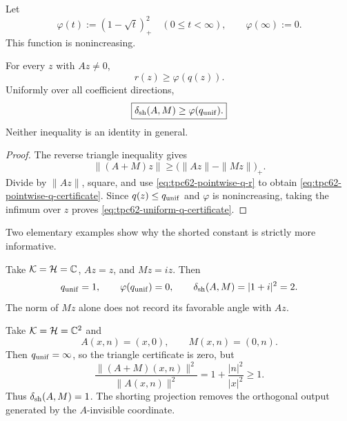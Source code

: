 Let
\begin{equation}
 \varphi(t):=(1-\sqrt t)_+^2
 \quad(0\le t<\infty),
 \qquad
 \varphi(\infty):=0.
 \label{eq:tpc62-triangle-profile}
\end{equation}
This function is nonincreasing.

\begin{proposition}
\label{prop:tpc62-q-certificates}
For every \(z\) with \(Az\ne0\),
\begin{equation}
 \boxed{r(z)\ge\varphi(q(z)).}
 \label{eq:tpc62-pointwise-q-certificate}
\end{equation}
Uniformly over all coefficient directions,
\begin{equation}
 \boxed{
 \delta_{\rm sh}(A,M)\ge\varphi(q_{\rm unif}).}
 \label{eq:tpc62-uniform-q-certificate}
\end{equation}
Neither inequality is an identity in general.
\end{proposition}

\begin{proof}
The reverse triangle inequality gives
\[
 \|(A+M)z\|
 \ge\bigl(\|Az\|-\|Mz\|\bigr)_+.
\]
Divide by \(\|Az\|\), square, and use
\eqref{eq:tpc62-pointwise-q-r} to obtain
\eqref{eq:tpc62-pointwise-q-certificate}.  Since
\(q(z)\le q_{\rm unif}\) and \(\varphi\) is nonincreasing, taking the
infimum over \(z\) proves
\eqref{eq:tpc62-uniform-q-certificate}.
\end{proof}

Two elementary examples show why the shorted constant is strictly more
informative.

\begin{example}
\label{ex:tpc62-q-angle-loss}
Take \(\mathcal K=\mathcal H=\mathbb C\), \(Az=z\), and \(Mz=iz\).  Then
\[
 q_{\rm unif}=1,
 \qquad
 \varphi(q_{\rm unif})=0,
 \qquad
 \delta_{\rm sh}(A,M)=|1+i|^2=2.
\]
The norm of \(Mz\) alone does not record its favorable angle with \(Az\).
\end{example}

\begin{example}
\label{ex:tpc62-q-infinite-shorted-positive}
Take \(\mathcal K=\mathcal H=\mathbb C^2\) and
\[
 A(x,n)=(x,0),
 \qquad
 M(x,n)=(0,n).
\]
Then \(q_{\rm unif}=\infty\), so the triangle certificate is zero, but
\[
 \frac{\|(A+M)(x,n)\|^2}{\|A(x,n)\|^2}
 =1+\frac{|n|^2}{|x|^2}\ge1.
\]
Thus \(\delta_{\rm sh}(A,M)=1\).  The shorting projection removes the
orthogonal output generated by the \(A\)-invisible coordinate.
\end{example}

